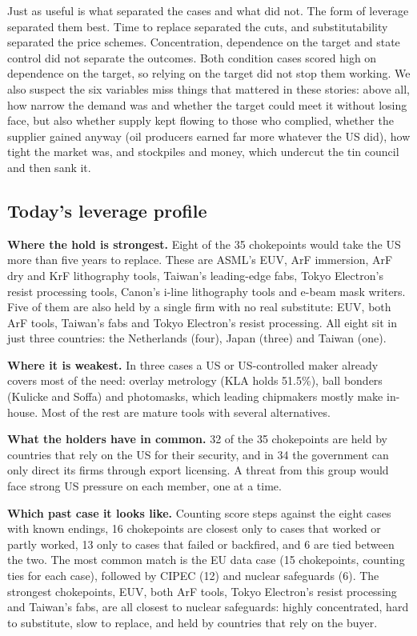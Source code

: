 \documentclass[11pt]{article}
\begin{document}
Just as useful is what separated the cases and what did not. The form of leverage separated them best. Time to replace separated the cuts, and substitutability separated the price schemes. Concentration, dependence on the target and state control did not separate the outcomes. Both condition cases scored high on dependence on the target, so relying on the target did not stop them working. We also suspect the six variables miss things that mattered in these stories: above all, how narrow the demand was and whether the target could meet it without losing face, but also whether supply kept flowing to those who complied, whether the supplier gained anyway (oil producers earned far more whatever the US did), how tight the market was, and stockpiles and money, which undercut the tin council and then sank it.

\subsection{Today's leverage profile}

\textbf{Where the hold is strongest.} Eight of the 35 chokepoints would take the US more than five years to replace. These are ASML's EUV, ArF immersion, ArF dry and KrF lithography tools, Taiwan's leading-edge fabs, Tokyo Electron's resist processing tools, Canon's i-line lithography tools and e-beam mask writers. Five of them are also held by a single firm with no real substitute: EUV, both ArF tools, Taiwan's fabs and Tokyo Electron's resist processing. All eight sit in just three countries: the Netherlands (four), Japan (three) and Taiwan (one).

\textbf{Where it is weakest.} In three cases a US or US-controlled maker already covers most of the need: overlay metrology (KLA holds 51.5\%), ball bonders (Kulicke and Soffa) and photomasks, which leading chipmakers mostly make in-house. Most of the rest are mature tools with several alternatives.

\textbf{What the holders have in common.} 32 of the 35 chokepoints are held by countries that rely on the US for their security, and in 34 the government can only direct its firms through export licensing. A threat from this group would face strong US pressure on each member, one at a time.

\textbf{Which past case it looks like.} Counting score steps against the eight cases with known endings, 16 chokepoints are closest only to cases that worked or partly worked, 13 only to cases that failed or backfired, and 6 are tied between the two. The most common match is the EU data case (15 chokepoints, counting ties for each case), followed by CIPEC (12) and nuclear safeguards (6). The strongest chokepoints, EUV, both ArF tools, Tokyo Electron's resist processing and Taiwan's fabs, are all closest to nuclear safeguards: highly concentrated, hard to substitute, slow to replace, and held by countries that rely on the buyer.
\end{document}
